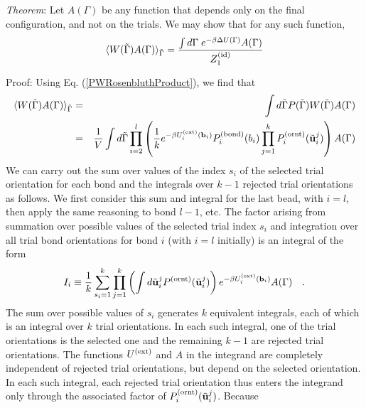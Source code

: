 \documentclass[12pt]{article} %
\newcommand{\vv}[1]{\mathbf{#1}}
\newcommand\chain{\Gamma}
\newcommand\delU{\Delta U}
\newcommand\Uext{U^{({\rm ext})}}
\newcommand\Zid{Z^{({\rm id})}}
\newcommand\nbead{l}
\newcommand\vbond{\vv{b}}
\newcommand\rbond{b}
\newcommand\ntrial{k}
\newcommand\utrial{\tilde{\vv{u}}}
\newcommand\Pbond{P^{({\rm bond})}}
\newcommand\Pornt{P^{({\rm ornt})}}
\newcommand\rconfig{\tilde{\chain}}
\begin{document}
{\it Theorem}: Let $A(\chain)$ be any function that depends only on the final 
configuration, and not on the trials. We may show that for any such function,
\begin{equation}
   \langle W(\rconfig) A(\chain) \rangle_{\rconfig} =
    \frac{\int d\chain \; e^{-\beta\delU(\chain)}A(\chain)}
         {\Zid_{1}} 
    \label{RosenbluthIntegralThm}
\end{equation}
\vspace{12pt}

\noindent
Proof: Using Eq. (\ref{PWRosenbluthProduct}), we find that
\begin{eqnarray}
   \langle W(\rconfig) A(\chain) \rangle_{\rconfig}
   & = & \int d\rconfig P(\rconfig)W(\rconfig) A(\chain) \\
   & = & \frac{1}{V} \int d\rconfig 
    \prod_{i=2}^{\nbead} \left (
    \frac{1}{k} e^{-\beta\Uext_{i}(\vbond_{i})}
                 \Pbond_{i}(\rbond_{i})
                 \prod_{j=1}^{\ntrial}
                 \Pornt_{i}(\utrial_{i}^{j}) \right )A(\chain)
    \nonumber
\end{eqnarray}
We can carry out the sum over values of the index $s_{i}$ of the selected 
trial orientation for each bond and the integrals over $\ntrial -1$ rejected 
trial orientations as follows. We first consider this sum and integral for
the last bead, with $i=\nbead$, then apply the same reasoning to bond 
$\nbead-1$, etc. The factor arising from summation over possible values 
of the selected trial index $s_{i}$ and integration over all trial bond
orientations for bond $i$ (with $i=\nbead$ initially) is an integral of 
the form
\begin{equation}
   I_i \equiv \frac{1}{k} \sum_{s_{i}=1}^{\ntrial}
   \prod_{j=1}^{\ntrial} \left ( \int d\utrial_{i}^{j} 
   \Pornt(\utrial_{i}^{j}) \right ) 
   e^{-\beta\Uext_{i}(\vbond_{i})} A(\chain) 
   \quad.
\end{equation}
The sum over possible values of $s_{i}$ generates $\ntrial$ equivalent 
integrals, each of which is an integral over $\ntrial$ trial orientations.
In each such integral, one of the trial orientations is the selected one
and the remaining $k-1$ are rejected trial orientations. The functions 
$\Uext$ and $A$ in the integrand are completely independent of rejected
trial orientations, but depend on the selected orientation. In each such 
integral, each rejected trial orientation thus enters the integrand only 
through the associated factor of $\Pornt_{i}(\utrial_{i}^{j})$. Because 
\end{document}
